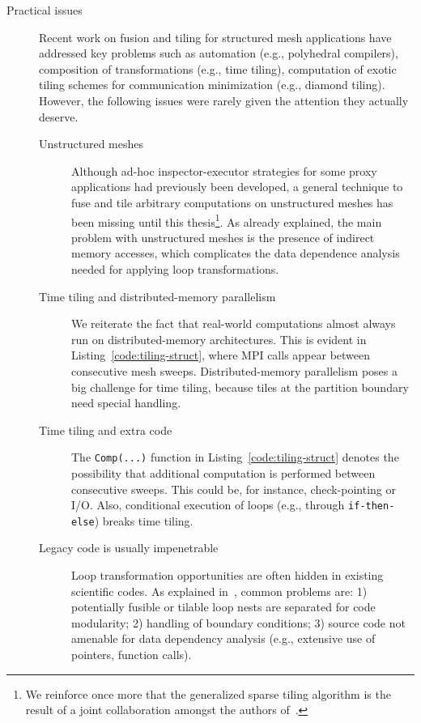 \begin{description}
\item[Practical issues] Recent work on fusion and tiling for structured mesh applications have addressed key problems such as automation (e.g., polyhedral compilers), composition of transformations (e.g., time tiling), computation of exotic tiling schemes for communication minimization (e.g., diamond tiling). However, the following issues were rarely given the attention they actually deserve.
\begin{description}
\item[Unstructured meshes] Although ad-hoc inspector-executor strategies for some proxy applications had previously been developed, a general technique to fuse and tile arbitrary computations on unstructured meshes has been missing until this thesis\footnote{We reinforce once more that the generalized sparse tiling algorithm is the result of a joint collaboration amongst the authors of~\citep{st-paper}.}. As already explained, the main problem with unstructured meshes is the presence of indirect memory accesses, which complicates the data dependence analysis needed for applying loop transformations.
\item[Time tiling and distributed-memory parallelism] We reiterate the fact that real-world computations almost always run on distributed-memory architectures. This is evident in Listing~\ref{code:tiling-struct}, where MPI calls appear between consecutive mesh sweeps. Distributed-memory parallelism poses a big challenge for time tiling, because tiles at the partition boundary need special handling.
\item[Time tiling and extra code] The \texttt{Comp(...)} function in Listing~\ref{code:tiling-struct} denotes the possibility that additional computation is performed between consecutive sweeps. This could be, for instance, check-pointing or I/O. Also, conditional execution of loops (e.g., through \texttt{if-then-else}) breaks time tiling. 
\item[Legacy code is usually impenetrable] Loop transformation opportunities are often hidden in existing scientific codes. As explained in~\cite{strout-common-problems}, common problems are: 1) potentially fusible or tilable loop nests are separated for code modularity; 2) handling of boundary conditions; 3) source code not amenable for data dependency analysis (e.g., extensive use of pointers, function calls).
\end{description}


\end{description}
